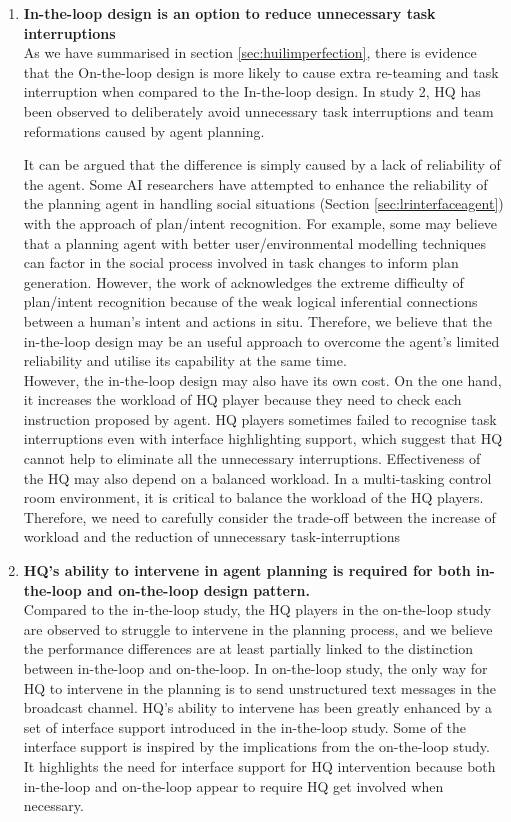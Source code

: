 \begin{enumerate}
\item \textbf{In-the-loop design is an option to reduce unnecessary task interruptions} \\
As we have summarised in section \ref{sec:huilimperfection}, there is evidence that the On-the-loop design is more likely to cause extra re-teaming and task interruption when compared to the In-the-loop design. In study 2, HQ has been observed to deliberately avoid unnecessary task interruptions and team reformations caused by agent planning. 

It can be argued that the difference is simply caused by a lack of reliability of the agent. Some AI researchers have attempted to enhance the reliability of the planning agent in handling social situations (Section \ref{sec:lrinterfaceagent}) with the approach of plan/intent recognition. For example, some may believe that a planning agent with better user/environmental modelling techniques can factor in the social process involved in task changes to inform plan generation. However, the work of \cite{Suchman1987} acknowledges the extreme difficulty of plan/intent recognition because of the weak logical inferential connections between a human's intent and actions in situ. Therefore, we believe that the in-the-loop design may be an useful approach to overcome the agent's limited reliability and utilise its capability at the same time.\\

However, the in-the-loop design may also have its own cost. On the one hand, it increases the workload of HQ player because they need to check each instruction proposed by agent. HQ players sometimes failed to recognise task interruptions even with interface highlighting support, which suggest that HQ cannot help to eliminate all the unnecessary interruptions. Effectiveness of the HQ may also depend on a balanced workload. In a multi-tasking control room environment, it is critical to balance the workload of the HQ players. Therefore, we need to carefully consider the trade-off between the increase of workload and the reduction of unnecessary task-interruptions \\

\item \textbf{HQ's ability to intervene in agent planning is required for both in-the-loop and on-the-loop design pattern.}\\
Compared to the in-the-loop study, the HQ players in the on-the-loop study are observed to struggle to intervene in the planning process, and we believe the performance differences are at least partially linked to the distinction between in-the-loop and on-the-loop. In on-the-loop study, the only way for HQ to intervene in the planning is to send unstructured text messages in the broadcast channel. HQ's ability to intervene has been greatly enhanced by a set of interface support introduced in the in-the-loop study. Some of the interface support is inspired by the implications from the on-the-loop study. It highlights the need for interface support for HQ intervention because both in-the-loop and on-the-loop appear to require HQ get involved when necessary. \\


\end{enumerate}
